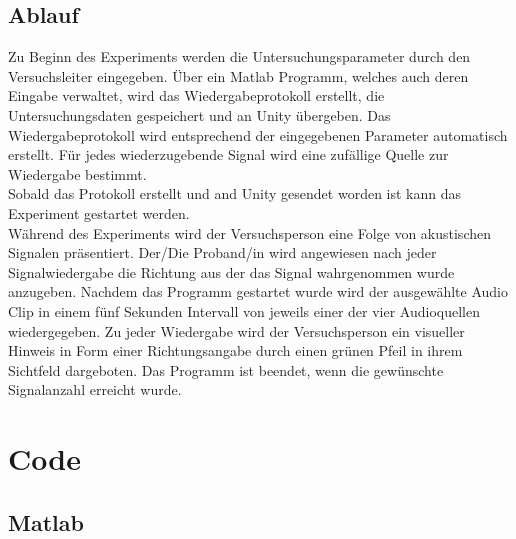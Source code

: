 \subsection{Ablauf}
Zu Beginn des Experiments werden die Untersuchungsparameter durch den Versuchsleiter eingegeben. Über ein Matlab Programm, welches auch deren Eingabe verwaltet, wird das Wiedergabeprotokoll erstellt, die Untersuchungsdaten gespeichert und an Unity übergeben.
Das Wiedergabeprotokoll wird entsprechend der eingegebenen Parameter automatisch erstellt.
Für jedes wiederzugebende Signal wird eine zufällige Quelle zur Wiedergabe bestimmt.\\
Sobald das Protokoll erstellt und and Unity gesendet worden ist kann das Experiment gestartet werden.\\
Während des Experiments wird der Versuchsperson eine Folge von akustischen Signalen präsentiert. Der/Die Proband/in wird angewiesen nach jeder Signalwiedergabe die Richtung aus der das Signal wahrgenommen wurde anzugeben. Nachdem das Programm gestartet wurde
wird der ausgewählte Audio Clip in einem fünf Sekunden Intervall von jeweils einer der vier Audioquellen wiedergegeben. Zu jeder Wiedergabe wird der Versuchsperson ein visueller Hinweis in Form einer Richtungsangabe durch einen grünen Pfeil in ihrem Sichtfeld dargeboten. Das Programm ist beendet, wenn die gewünschte Signalanzahl erreicht wurde.

\newpage
\section{Code}
\subsection{Matlab}



